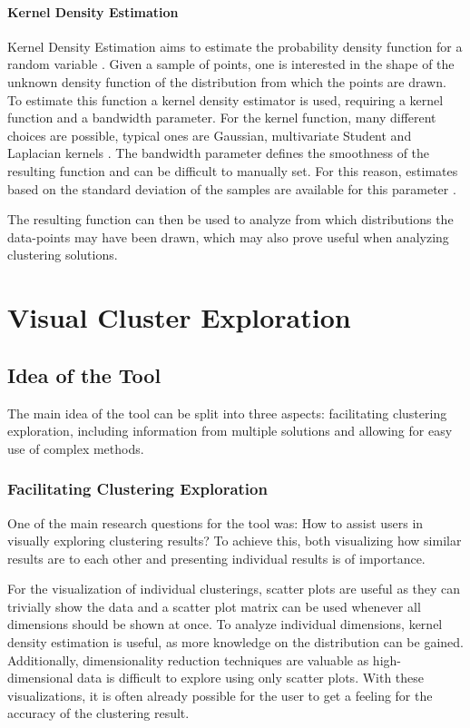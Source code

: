 \documentclass[
	a4paper,
	english,
	twoside,
	openright,               
	11pt                            
	]{report}
\begin{document}

\subsection{Kernel Density Estimation}
Kernel Density Estimation aims to estimate the probability density function for a random variable \cite{parzen1962estimation}. Given a sample of points, one is interested in the shape of the unknown density function of the distribution from which the points are drawn. To estimate this function a kernel density estimator is used, requiring a kernel function and a bandwidth parameter. For the kernel function, many different choices are possible, typical ones are Gaussian, multivariate Student and Laplacian kernels \cite{kim2011robust}. The bandwidth parameter defines the smoothness of the resulting function and can be difficult to manually set. For this reason, estimates based on the standard deviation of the samples are available for this parameter \cite{rulethumbdens}.

The resulting function can then be used to analyze from which distributions the data-points may have been drawn, which may also prove useful when analyzing clustering solutions.

\part{Visual Cluster Exploration}
\chapter{Idea of the Tool}\label{cha:idea}

The main idea of the tool can be split into three aspects: facilitating clustering exploration, including information from multiple solutions and allowing for easy use of complex methods.

\section{Facilitating Clustering Exploration}
One of the main research questions for the tool was: How to assist users in visually exploring clustering results? To achieve this, both visualizing how similar results are to each other and presenting individual results is of importance.

 For the visualization of individual clusterings, scatter plots are useful as they can trivially show the data and a scatter plot matrix can be used whenever all dimensions should be shown at once. To analyze individual dimensions, kernel density estimation is useful, as more knowledge on the distribution can be gained. Additionally, dimensionality reduction techniques are valuable as high-dimensional data is difficult to explore using only scatter plots. With these visualizations, it is often already possible for the user to get a feeling for the accuracy of the clustering result.
\end{document}
